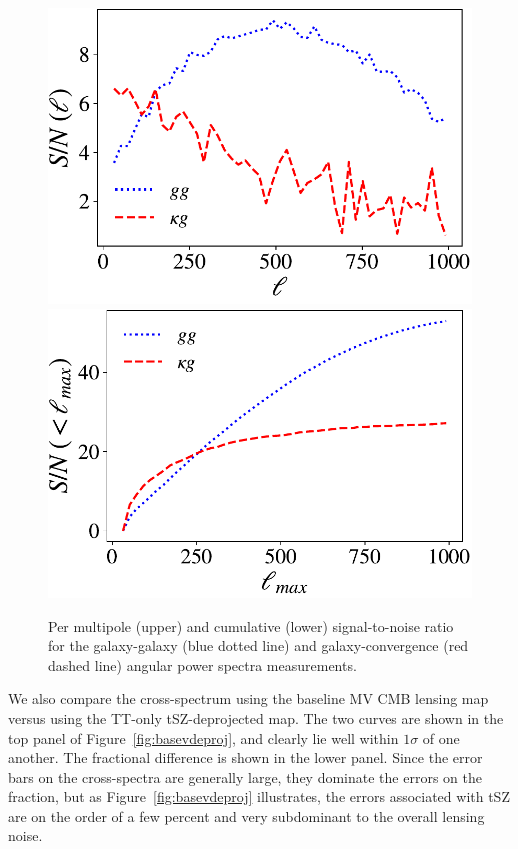 \documentclass[a4paper,usenatbib]{mnras}
\begin{document}
\begin{figure}
\includegraphics[width=0.9\linewidth]{figures/snr.pdf}
\vspace{1cm}
\includegraphics[width=0.9\linewidth]{figures/snr_cum.pdf}
\caption{Per multipole (upper) and cumulative (lower) signal-to-noise ratio for the galaxy-galaxy (blue dotted line) and galaxy-convergence (red dashed line) angular power spectra measurements.}
\label{fig:snr}
\end{figure}

We also compare the cross-spectrum using the baseline MV CMB lensing map versus using the TT-only tSZ-deprojected map. The two curves are shown in the top panel of Figure~\ref{fig:basevdeproj}, and clearly lie well within $1\sigma$ of one another. The fractional difference is shown in the lower panel. Since the error bars on the cross-spectra are generally large, they dominate the errors on the fraction, but as Figure~\ref{fig:basevdeproj} illustrates, the errors associated with tSZ are on the order of a few percent and very subdominant to the overall lensing noise.
\end{document}
